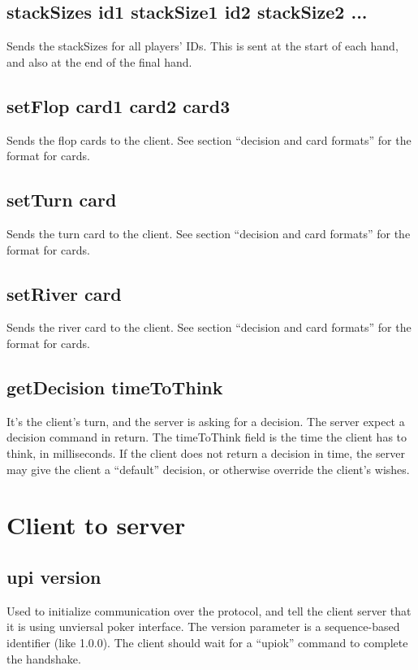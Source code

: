 \documentclass{article}
\begin{document}
\subsection{stackSizes \textlangle{}id1 stackSize1\textrangle{} \textlangle{}id2 stackSize2\textrangle{} ... }
Sends the stackSizes for all players' IDs. This is sent at the start of each hand, and also at the end of the final hand.

\subsection{setFlop \textlangle{}card1\textrangle{} \textlangle{}card2\textrangle{}  \textlangle{}card3\textrangle{}}
Sends the flop cards to the client. See section ``decision and card formats'' for the format for cards.

\subsection{setTurn \textlangle{}card\textrangle{}}
Sends the turn card to the client. See section ``decision and card formats'' for the format for cards.

\subsection{setRiver \textlangle{}card\textrangle{}}
Sends the river card to the client. See section ``decision and card formats'' for the format for cards.

\subsection{getDecision \textlangle{}timeToThink\textrangle{}}
It's the client's turn, and the server is asking for a decision. The server expect a decision command in return. The timeToThink field is the time the client has to think, in milliseconds. If the client does not return a decision in time, the server may give the client a ``default'' decision, or otherwise override the client's wishes.

\section{Client to server}

\subsection{upi \textlangle{}version\textrangle{}}
Used to initialize communication over the protocol, and tell the client server that it is using unviersal poker interface. The version parameter is a sequence-based identifier (like 1.0.0). The client should wait for a ``upiok'' command to complete the handshake.
\end{document}
